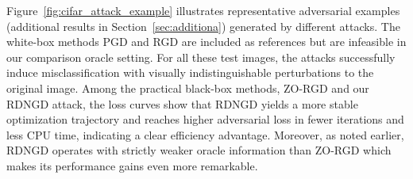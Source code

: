 \documentclass{article}
\theoremstyle{plain}
\theoremstyle{definition}
\theoremstyle{remark}
\begin{document}
Figure~\ref{fig:cifar_attack_example} illustrates representative adversarial examples (additional results in Section~\ref{sec:additiona}) generated by different attacks. The white-box methods PGD and RGD are included as references but are infeasible in our comparison oracle setting. For all these test images, the attacks successfully induce misclassification with visually indistinguishable perturbations to the original image. Among the practical black-box methods, ZO-RGD and our RDNGD attack, the loss curves show that RDNGD yields a more stable optimization trajectory and reaches higher adversarial loss in fewer iterations and less CPU time, indicating a clear efficiency advantage. Moreover, as noted earlier, RDNGD operates with strictly weaker oracle information than ZO-RGD which makes its performance gains even more remarkable.
\end{document}
